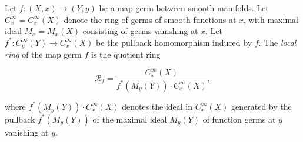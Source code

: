 Let $f: (X, x) \to (Y, y)$ be a map germ between smooth manifolds. Let $C_x^\infty = C_x^\infty(X)$ denote the ring of germs of smooth functions at $x$, with maximal ideal $M_x = M_x(X)$ consisting of germs vanishing at $x$. Let $f^*: C_y^\infty(Y) \to C_x^\infty(X)$ be the pullback homomorphism induced by $f$. The {\em local ring} of the map germ $f$ is the quotient ring

$$
\mathcal{R}_f = \frac{C_x^\infty(X)}{f^*(M_y(Y)) \cdot C_x^\infty(X)},
$$

where $f^*(M_y(Y)) \cdot C_x^\infty(X)$ denotes the ideal in $C_x^\infty(X)$ generated by the pullback $f^*(M_y(Y))$ of the maximal ideal $M_y(Y)$ of function germs at $y$ vanishing at $y$.

